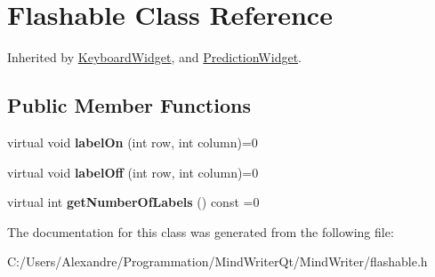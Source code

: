 \hypertarget{class_flashable}{\section{Flashable Class Reference}
\label{class_flashable}
}


Inherited by \hyperlink{class_keyboard_widget}{Keyboard\-Widget}, and \hyperlink{class_prediction_widget}{Prediction\-Widget}.

\subsection*{Public Member Functions}
\begin{DoxyCompactItemize}
\item 
\hypertarget{class_flashable_af435c1e2eb23db60a47188356968bd8b}{virtual void {\bfseries label\-On} (int row, int column)=0}\label{class_flashable_af435c1e2eb23db60a47188356968bd8b}

\item 
\hypertarget{class_flashable_a2ed7a541f1114ebf1b9cb0573398a417}{virtual void {\bfseries label\-Off} (int row, int column)=0}\label{class_flashable_a2ed7a541f1114ebf1b9cb0573398a417}

\item 
\hypertarget{class_flashable_a4413b1fb84951212da89bcb04a133e02}{virtual int {\bfseries get\-Number\-Of\-Labels} () const =0}\label{class_flashable_a4413b1fb84951212da89bcb04a133e02}

\end{DoxyCompactItemize}


The documentation for this class was generated from the following file\-:\begin{DoxyCompactItemize}
\item 
C\-:/\-Users/\-Alexandre/\-Programmation/\-Mind\-Writer\-Qt/\-Mind\-Writer/flashable.\-h\end{DoxyCompactItemize}
